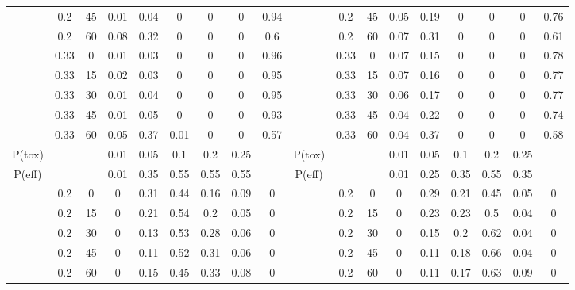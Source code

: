 \begin{table}
{\begin{tabular}[t]{cccccccc>{}c|ccccccccc}
			& 0.2 & 45 & 0.01 & 0.04 & 0 & 0 & 0 & 0.94 &  & 0.2 & 45 & 0.05 & 0.19 & 0 & 0 & 0 & 0.76\\
			
			& 0.2 & 60 & 0.08 & 0.32 & 0 & 0 & 0 & 0.6 &  & 0.2 & 60 & 0.07 & 0.31 & 0 & 0 & 0 & 0.61\\
			
			& 0.33 & 0 & 0.01 & 0.03 & 0 & 0 & 0 & 0.96 &  & 0.33 & 0 & 0.07 & 0.15 & 0 & 0 & 0 & 0.78\\
			
			& 0.33 & 15 & 0.02 & 0.03 & 0 & 0 & 0 & 0.95 &  & 0.33 & 15 & 0.07 & 0.16 & 0 & 0 & 0 & 0.77\\
			
			& 0.33 & 30 & 0.01 & 0.04 & 0 & 0 & 0 & 0.95 &  & 0.33 & 30 & 0.06 & 0.17 & 0 & 0 & 0 & 0.77\\
			
			& 0.33 & 45 & 0.01 & 0.05 & 0 & 0 & 0 & 0.93 &  & 0.33 & 45 & 0.04 & 0.22 & 0 & 0 & 0 & 0.74\\
			
			\multirow{-10}{*}{\centering\arraybackslash 4} & 0.33 & 60 & 0.05 & 0.37 & 0.01 & 0 & 0 & 0.57 & \multirow{-10}{*}{\centering\arraybackslash 10} & 0.33 & 60 & 0.04 & 0.37 & 0 & 0 & 0 & 0.58\\
			\cmidrule{1-18}
			P(tox) &  &  & 0.01 & 0.05 & 0.1 & 0.2 & 0.25 &  & P(tox) &  &  & 0.01 & 0.05 & 0.1 & 0.2 & 0.25 & \\
			\cmidrule{1-18}
			P(eff) &  &  & 0.01 & 0.35 & 0.55 & 0.55 & 0.55 &  & P(eff) &  &  & 0.01 & 0.25 & 0.35 & 0.55 & 0.35 \vphantom{1} & \\
			\cmidrule{1-18}
			& 0.2 & 0 & 0 & 0.31 & 0.44 & 0.16 & 0.09 & 0 &  & 0.2 & 0 & 0 & 0.29 & 0.21 & 0.45 & 0.05 & 0\\
			
			& 0.2 & 15 & 0 & 0.21 & 0.54 & 0.2 & 0.05 & 0 &  & 0.2 & 15 & 0 & 0.23 & 0.23 & 0.5 & 0.04 & 0\\
			
			& 0.2 & 30 & 0 & 0.13 & 0.53 & 0.28 & 0.06 & 0 &  & 0.2 & 30 & 0 & 0.15 & 0.2 & 0.62 & 0.04 & 0\\
			
			& 0.2 & 45 & 0 & 0.11 & 0.52 & 0.31 & 0.06 & 0 &  & 0.2 & 45 & 0 & 0.11 & 0.18 & 0.66 & 0.04 & 0\\
			
			& 0.2 & 60 & 0 & 0.15 & 0.45 & 0.33 & 0.08 & 0 &  & 0.2 & 60 & 0 & 0.11 & 0.17 & 0.63 & 0.09 & 0\\
			

\end{tabular}}
\end{table}
